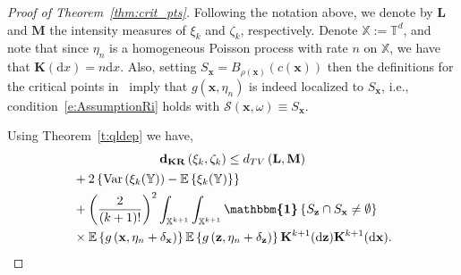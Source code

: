 \documentclass[AHL,Unicode,longabstracts]{cedram}
\newcommand*\bL{\mathbf{L}}
\newcommand*\bM{\mathbf{M}}
\newcommand*\bK{\mathbf{K}}
\newcommand{\bz}{\mathbf{z}}
\newcommand{\bx}{\mathbf{x}}
\newcommand*\dkr{\mathbf{d_{KR}}}
\newcommand*\T{\mathbb{T}}
\newcommand*\X{\mathbb{X}}
\newcommand*\Y{\mathbb{Y}}
\newcommand{\E}{\mathbb{E}}
\newcommand*\cS{\mathcal{S}}
\newcommand*\md{\mathrm{d}}
\newcommand{\mean}[1] {\E\left\{{#1}\right\}}
\newcommand{\ind}{\boldsymbol{\mathbbm{1}}}
\newcommand{\var}[1]{\mathrm{Var}\param{{#1}}}
\newcommand{\set}[1]{\left\{#1\right\}}
\newcommand{\param}[1]{\left(#1\right)}
\begin{document}
\begin{proof}[Proof of Theorem~\ref{thm:crit_pts}]
Following the notation above, we denote by $\bL$ and $\bM$ the intensity measures of $\xi_k$ and $\zeta_k$, respectively. Denote $\X := \T^d$, and note that since $\eta_n$ is a homogeneous Poisson process with rate $n$ on $\X$, we have that $\bK(\md x) = n\md x$. Also, setting $S_{\bx} = B_{\rho(\bx)}(c(\bx))$ then the definitions for the critical points in~\cite{Bobrowski2019} imply that $g(\bx,\eta_n)$ is indeed localized to $S_{\bx}$, i.e., condition~\eqref{e:AssumptionRi} holds with $\cS(\bx,\omega) \equiv S_{\bx}$.

Using Theorem~\ref{t:qldep} we have,
\begin{multline}\label{e:crit_pt_KR}
\dkr\left(\xi_k,\zeta_k\right) \le d_{TV}\left({\bL},{\bM}\right)\\
\begin{aligned} 
&+ 2\left\{\var{\xi_k(\Y)} - \mean{\xi_k(\Y)}\right\}\\
&+ \param{\frac{2}{(k+1)!}}^2 \int_{\X^{k+1}} \int_{\X^{k+1}}\ind\set{S_{\bz}\cap S_{\bx}\ne \emptyset}\\
& \times\mean{g\left(\bx,{\eta_n}+\delta_{\bx}\right)} \mean{g\left(\bz,{\eta_n}+\delta_{\bz}\right)} \bK^{k+1}(\md\bz) \bK^{k+1}(\md\bx).
\end{aligned}
\end{multline}


\end{proof}
\end{document}
